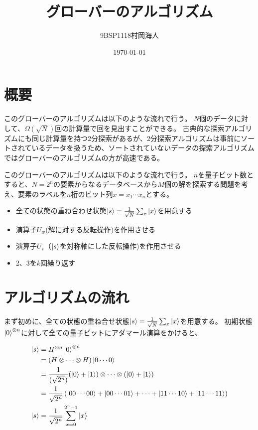 \documentclass[platex,dvipdfmx]{jlreq}			%
\title{グローバーのアルゴリズム}
\author{9BSP1118村岡海人}
\date{\today}
\begin{document}
    \maketitle

    \section{概要}
    このグローバーのアルゴリズムは以下のような流れで行う。
    $N$個のデータに対して、$\Omega(\sqrt{N})$回の計算量で回を見出すことができる。
    古典的な探索アルゴリズムにも同じ計算量を持つ2分探索があるが、2分探索アルゴリズムは事前にソートされているデータを扱うため、ソートされていないデータの探索アルゴリズムではグローバーのアルゴリズムの方が高速である。

    このグローバーのアルゴリズムは以下のような流れで行う。
    $n$を量子ビット数とすると、$N = 2^n$の要素からなるデータベースから$M$個の解を探索する問題を考え、要素のラベルを$n$桁のビット列$x = x_1 \cdots x_n$とする。

    \begin{itemize}
        \item 全ての状態の重ね合わせ状態$\ket{s} = \frac{1}{\sqrt{N}} \sum_x \ket{x}$を用意する 
        \item 演算子$U_w$(解に対する反転操作)を作用させる 
        \item 演算子$U_s$（$\ket{s}$を対称軸にした反転操作)を作用させる 
        \item 2、3を$k$回繰り返す 
    \end{itemize}

    \section{アルゴリズムの流れ}
    まず初めに、全ての状態の重ね合せ状態$\ket{s} = \frac{1}{\sqrt{N}} \sum_x \ket{x}$を用意する。
    初期状態$\ket{0}^{\otimes n}$に対して全ての量子ビットにアダマール演算をかけると、

    \begin{equation}
        \begin{split}
        \ket{s} &= H^{\otimes n} \ket{0}^{\otimes n} \\ 
        &= (H \otimes \cdots \otimes H)\ket{0\cdots0} \\
        &= \frac{1}{(\sqrt{2^n})} (\ket{0} + \ket{1})\otimes\cdots\otimes (\ket{0} + \ket{1}) \\
        &= \frac{1}{\sqrt{2^n}} \left( \ket{00 \cdots 00} + \ket{00 \cdots 01} + \cdots + \ket{11 \cdots 10} + \ket{11 \cdots 11}\right) \\
        \ket{s} &= \frac{1}{\sqrt{2^n}} \sum^{2^n - 1}_{x = 0} \ket{x}
        \end{split}
    \end{equation}
\end{document}
